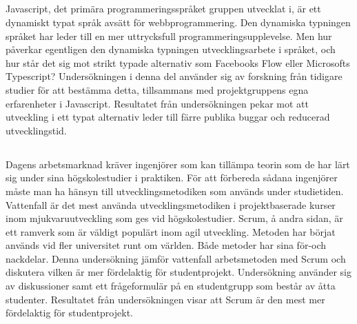 \subsection*{}
Javascript, det primära programmeringsspråket gruppen utvecklat i, är ett dynamiskt typat språk avsätt för webbprogrammering. Den dynamiska typningen språket har leder till en mer uttrycksfull programmeringsupplevelse. Men hur påverkar egentligen den dynamiska typningen utvecklingsarbete i språket, och hur står det sig mot strikt typade alternativ som Facebooks Flow eller Microsofts Typescript? Undersökningen i denna del använder sig av forskning från tidigare studier för att bestämma detta, tillsammans med projektgruppens egna erfarenheter i Javascript. Resultatet från undersökningen pekar mot att utveckling i ett typat alternativ leder till färre publika buggar och reducerad utvecklingstid.

\subsection*{}
Dagens arbetsmarknad kräver ingenjörer som kan tillämpa teorin som de har lärt sig under sina högskolestudier i praktiken. För att förbereda sådana ingenjörer måste man ha hänsyn till utvecklingsmetodiken som används under studietiden. Vattenfall är det mest använda utvecklingsmetodiken i projektbaserade kurser inom mjukvaruutveckling som ges vid högskolestudier. Scrum, å andra sidan, är ett ramverk som är väldigt populärt inom agil utveckling. Metoden har börjat används vid fler universitet runt om världen. Både metoder har sina för-och nackdelar. Denna undersökning jämför vattenfall arbetsmetoden med Scrum och diskutera vilken är mer fördelaktig för studentprojekt. Undersökning använder sig av diskussioner samt ett frågeformulär på en studentgrupp som består av åtta studenter. Resultatet från undersökningen visar att Scrum är den mest mer fördelaktig för studentprojekt. 